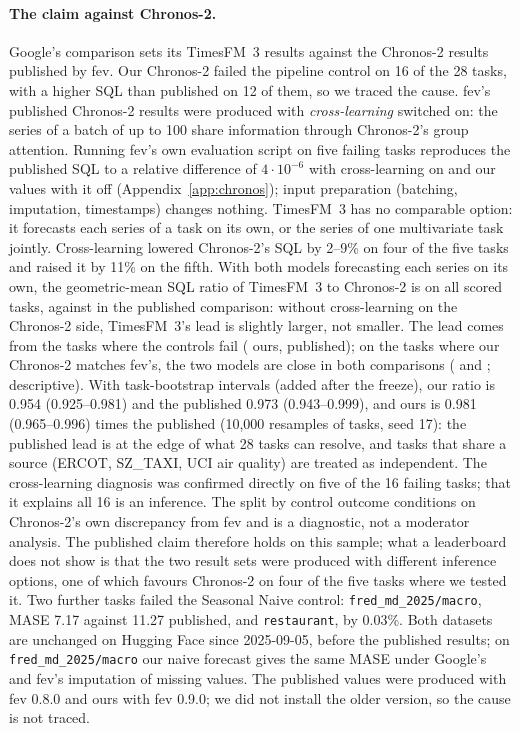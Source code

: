 \paragraph{The claim against Chronos-2.} Google's comparison sets its TimesFM~3 results against the Chronos-2 results published by
fev. Our Chronos-2 failed the pipeline control on 16 of the 28 tasks, with a
higher SQL than published on 12 of them, so we traced the cause. fev's
published Chronos-2 results were produced with \emph{cross-learning} switched on: the series of a batch of up to 100 share
information through Chronos-2's group attention. Running fev's own evaluation script on five failing tasks reproduces the published
SQL to a relative difference of $4\cdot10^{-6}$ with cross-learning on and our values with it off (Appendix~\ref{app:chronos}); input preparation (batching,
imputation, timestamps) changes nothing. TimesFM~3 has no comparable option: it forecasts each series of a task on its own, or the
series of one multivariate task jointly. Cross-learning lowered Chronos-2's SQL by 2--9\% on four of the five tasks and raised it by
11\% on the fifth. With both models forecasting each series on its own, the geometric-mean SQL ratio of TimesFM~3 to Chronos-2 is
\ASkillOurs{} on all scored tasks, against \ASkillPubl{} in the published comparison: without cross-learning on the Chronos-2 side,
TimesFM~3's lead is slightly larger, not smaller. The lead comes from the \AFailTasks{} tasks where the controls fail
(\ASkillOursFail{} ours, \ASkillPublFail{} published); on the \AControlTasks{} tasks where our Chronos-2 matches fev's, the two
models are close in both comparisons (\ASkillOursCtl{} and \ASkillPublCtl{}; descriptive). With task-bootstrap intervals (added after the freeze), our ratio is 0.954
(0.925--0.981) and the published 0.973 (0.943--0.999), and ours is 0.981 (0.965--0.996) times the published (10{,}000 resamples of
tasks, seed 17): the published lead is at the edge of what 28 tasks can resolve, and tasks that share a source (ERCOT, SZ\_TAXI,
UCI air quality) are treated as independent. The cross-learning diagnosis was confirmed directly on five of the 16 failing tasks;
that it explains all 16 is an inference. The split by control outcome conditions on Chronos-2's own discrepancy from fev and is a
diagnostic, not a moderator analysis. The published claim therefore holds on this
sample; what a leaderboard does not show is that the two result sets were produced with different inference options, one of which
favours Chronos-2 on four of the five tasks where we tested it. Two further tasks failed the Seasonal Naive control: \texttt{fred\_md\_2025/macro}, MASE 7.17 against 11.27 published, and
\texttt{restaurant}, by 0.03\%. Both datasets are unchanged on Hugging Face since 2025-09-05, before the published results; on
\texttt{fred\_md\_2025/macro} our naive forecast gives the same MASE under Google's and fev's imputation of missing values. The published
values were produced with fev 0.8.0 and ours with fev 0.9.0; we did not install the older version, so the cause is not traced.

